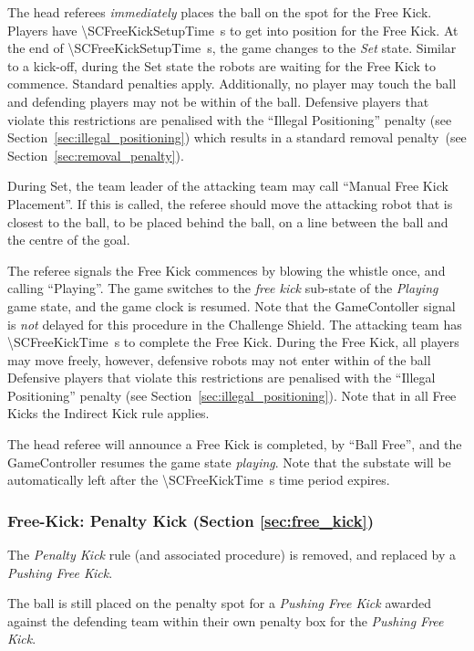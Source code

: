 The head referees \emph{immediately} places the ball on the spot for the Free Kick.
Players have \qty{\SCFreeKickSetupTime}{\second} to get into position for the Free Kick.
At the end of \qty{\SCFreeKickSetupTime}{\second}, the game changes to the \textit{Set} state.
Similar to a kick-off, during the Set state the robots are waiting for the Free Kick to commence.
Standard penalties apply.
Additionally, no player may touch the ball and defending players may not be within \FreeKickRadius of the ball.
Defensive players that violate this restrictions are penalised with the ``Illegal Positioning'' penalty (see Section~\ref{sec:illegal_positioning}) which results in a standard removal penalty~(see Section~\ref{sec:removal_penalty}).

During Set, the team leader of the attacking team may call ``Manual Free Kick Placement''.
If this is called, the referee should move the attacking robot that is closest to the ball, to be placed \SCFreeKickDistance behind the ball, on a line between the ball and the centre of the goal.

The referee signals the Free Kick commences by blowing the whistle once, and calling ``Playing''.
The game switches to the \textit{free kick} sub-state of the \textit{Playing} game state, and the game clock is resumed.
Note that the GameContoller signal is \emph{not} delayed for this procedure in the Challenge Shield.
The attacking team has \qty{\SCFreeKickTime}{\second} to complete the Free Kick.
During the Free Kick, all players may move freely, however, defensive robots may not enter within \FreeKickRadius of the ball Defensive players that violate this restrictions are penalised with the ``Illegal Positioning'' penalty (see Section~\ref{sec:illegal_positioning}).
Note that in all Free Kicks the Indirect Kick rule applies.

The head referee will announce a Free Kick is completed, by ``Ball Free'', and the GameController resumes the game state \emph{playing}. Note that the substate will be automatically left after the \qty{\SCFreeKickTime}{\second} time period expires.

\subsubsection{Free-Kick: Penalty Kick (Section \ref{sec:free_kick})}

The \emph{Penalty Kick} rule (and associated procedure) is removed, and replaced by a \emph{Pushing Free Kick}.

The ball is still placed on the penalty spot for a \emph{Pushing Free Kick} awarded against the defending team within their own penalty box for the \emph{Pushing Free Kick}.

